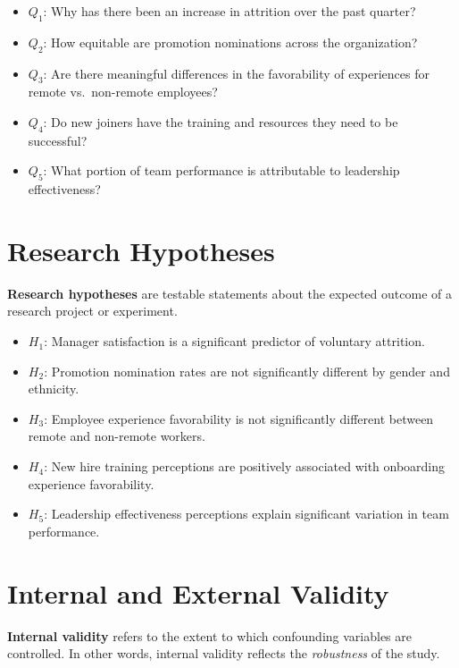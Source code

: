 \documentclass[
]{book}
\providecommand{\tightlist}{%
  \setlength{\itemsep}{0pt}\setlength{\parskip}{0pt}}
\begin{document}
\begin{itemize}
\tightlist
\item
  \(Q_1\): Why has there been an increase in attrition over the past quarter?
\item
  \(Q_2\): How equitable are promotion nominations across the organization?
\item
  \(Q_3\): Are there meaningful differences in the favorability of experiences for remote vs.~non-remote employees?
\item
  \(Q_4\): Do new joiners have the training and resources they need to be successful?
\item
  \(Q_5\): What portion of team performance is attributable to leadership effectiveness?
\end{itemize}

\hypertarget{research-hypotheses}{%
\section{Research Hypotheses}\label{research-hypotheses}}

\textbf{Research hypotheses} are testable statements about the expected outcome of a research project or experiment.

\begin{itemize}
\tightlist
\item
  \(H_1\): Manager satisfaction is a significant predictor of voluntary attrition.
\item
  \(H_2\): Promotion nomination rates are not significantly different by gender and ethnicity.
\item
  \(H_3\): Employee experience favorability is not significantly different between remote and non-remote workers.
\item
  \(H_4\): New hire training perceptions are positively associated with onboarding experience favorability.
\item
  \(H_5\): Leadership effectiveness perceptions explain significant variation in team performance.
\end{itemize}

\hypertarget{internal-and-external-validity}{%
\section{Internal and External Validity}\label{internal-and-external-validity}}

\textbf{Internal validity} refers to the extent to which confounding variables are controlled. In other words, internal validity reflects the \emph{robustness} of the study.
\end{document}
